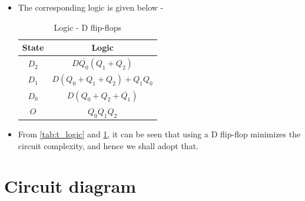 \documentclass[a4paper,12pt]{article}
\begin{document}
\begin{itemize}
\item The corresponding logic is given below - \\
\begin{table}[ht]
    \centering
    \begin{tabular}{|c|c|}
        \hline
        \textbf{State} & \textbf{Logic} \\
        \hline
        $D_2$ & $D \overline{Q_0} (Q_1 + Q_2)$ \\
        \hline
        $D_1$ & $D(Q_0 + Q_1 + Q_2) + Q_1 Q_0$ \\
        \hline
        $D_0$ & $D (Q_0 + Q_2 + \overline{Q_1})$ \\
        \hline
        $O$ & $Q_0 Q_1 Q_2$ \\
        \hline
    \end{tabular}
    \caption{Logic - D flip-flops}
    \label{tab:d_logic}
\end{table}
\item From \ref{tab:t_logic} and \ref{tab:d_logic}, it can be seen that using a D flip-flop minimizes the circuit complexity, and hence we shall adopt that.
\end{itemize}

\section{Circuit diagram}
\end{document}
